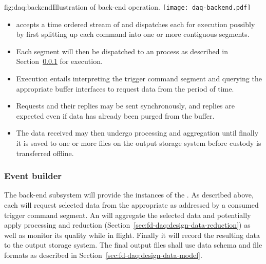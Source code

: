 \begin{dunefigure}{fig:daq:backend}{Illustration of   back-end operation.}
  \texttt{[image: daq-backend.pdf]}
\end{dunefigure}

\begin{itemize}
\item {} accepts a time ordered stream of  and dispatches each for execution possibly by first splitting up each command into one or more contiguous segments.
\item Each segment will then be dispatched to an  process as described in Section~\ref{sec:fd-daq:design-event-builder} for execution.
\item Execution entails interpreting the trigger command segment and querying the appropriate  buffer interfaces to request data from the period of time. 
\item Requests and their replies may be sent synchronously, and replies are expected even if data has already been purged from the  buffer.
\item The data received may then undergo processing and aggregation until finally it is saved to one or more files on the output storage system before custody is transferred offline.
\end{itemize}



\subsubsection{Event builder}
\label{sec:fd-daq:design-event-builder}

The  back-end subsystem will provide the instances of the .
As described above, each will request selected data from the appropriate  as addressed by a consumed trigger command segment. 
An  will aggregate the selected data and potentially apply processing and reduction (Section~\ref{sec:fd-daq:design-data-reduction}) as well as monitor its quality while in flight.
Finally it will record the resulting data to the output storage system.
The final output files shall use data schema and file formats as described in Section~\ref{sec:fd-daq:design-data-model}.



